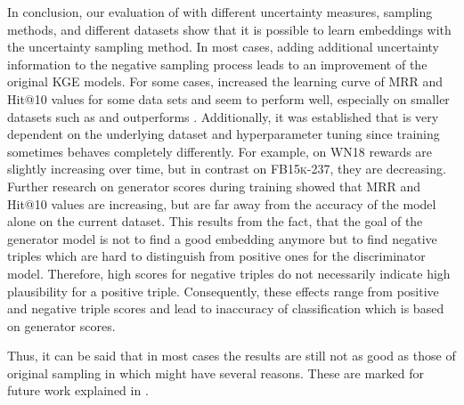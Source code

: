 In conclusion, our evaluation of \usgan with different uncertainty measures, sampling methods, and different datasets show that it is possible to learn embeddings with the uncertainty sampling method.
In most cases, adding additional uncertainty information to the negative sampling process leads to an improvement of the original \ac{KGE} models.
For some cases, \usgan increased the learning curve of MRR and Hit@10 values for some data sets and seem to perform well, especially on smaller datasets such as \umls and outperforms \kbgan.
Additionally, it was established that \usgan is very dependent on the underlying dataset and hyperparameter tuning since training sometimes behaves completely differently.
For example, on \textsc{WN18} rewards are slightly increasing over time, but in contrast on \textsc{FB15k-237}, they are decreasing.
Further research on generator scores during training showed that MRR and Hit@10 values are increasing, but are far away from the accuracy of the model alone on the current dataset.
This results from the fact, that the goal of the generator model is not to find a good embedding anymore but to find negative triples which are hard to distinguish from positive ones for the discriminator model.
Therefore, high scores for negative triples do not necessarily indicate high plausibility for a positive triple.
Consequently, these effects range from positive and negative triple scores and lead to inaccuracy of classification which is based on generator scores.

Thus, it can be said that in most cases the results are still not as good as those of original sampling in \kbgan which might have several reasons.
These are marked for future work explained in .